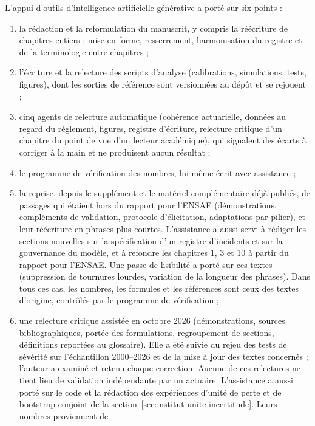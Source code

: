 L'appui d'outils d'intelligence artificielle générative a porté sur six points :
\begin{enumerate}[itemsep=0pt,topsep=3pt]
\item la rédaction et la reformulation du manuscrit, y compris la réécriture de chapitres entiers :
      mise en forme, resserrement, harmonisation du registre et de la terminologie entre chapitres ;
\item l'écriture et la relecture des scripts d'analyse (calibrations, simulations, tests,
      figures), dont les sorties de référence sont versionnées au dépôt et se rejouent ;
\item cinq agents de relecture automatique (cohérence actuarielle, données au regard du
      règlement, figures, registre d'écriture, relecture critique d'un chapitre du point de vue d'un
      lecteur académique), qui signalent des écarts à corriger à la main et ne produisent aucun
      résultat ;
\item le programme de vérification des nombres, lui-même écrit avec assistance ;
\item la reprise, depuis le supplément et le matériel complémentaire déjà publiés, de passages
      qui étaient hors du rapport pour l'ENSAE (démonstrations, compléments de validation, protocole
      d'élicitation, adaptations par pilier), et leur réécriture en phrases plus courtes.
      L'assistance a aussi servi à rédiger les sections nouvelles sur la spécification d'un registre
      d'incidents et sur la gouvernance du modèle, et à refondre les chapitres 1, 3 et 10 à partir
      du rapport pour l'ENSAE. Une passe de lisibilité a porté sur ces textes (suppression de
      tournures lourdes, variation de la longueur des phrases). Dans tous ces cas, les nombres, les formules et les références
      sont ceux des textes d'origine, contrôlés par le programme de vérification ;
\item une relecture critique assistée en octobre 2026 (démonstrations, sources bibliographiques,
      portée des formulations, regroupement de sections, définitions reportées au glossaire). Elle a
      été suivie du rejeu des tests de sévérité sur l'échantillon 2000--2026 et de la mise à jour
      des textes concernés ; l'auteur a examiné et retenu chaque correction. Aucune de ces
      relectures ne tient lieu de validation indépendante par un actuaire. L'assistance a aussi
      porté sur le code et la rédaction des expériences d'unité de perte et de bootstrap conjoint
      de la section~\ref{sec:institut-unite-incertitude}. Leurs nombres proviennent de

\end{enumerate}
